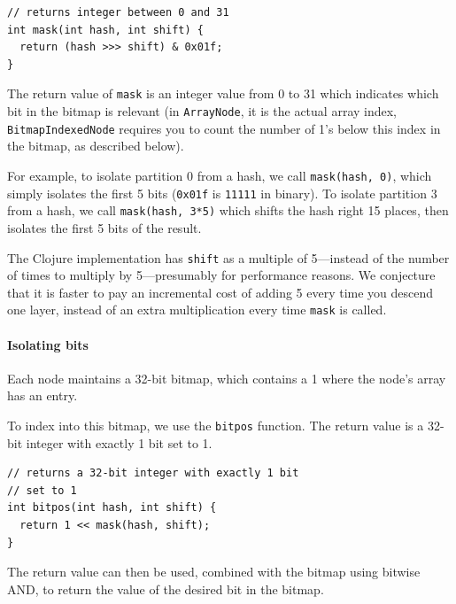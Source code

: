 \documentclass[preprint]{sigplanconf}
\begin{document}
\begin{verbatim}
// returns integer between 0 and 31
int mask(int hash, int shift) {
  return (hash >>> shift) & 0x01f;
}
\end{verbatim}

The return value of \texttt{mask}
is an integer value from 0 to 31
which indicates which bit in the bitmap
is relevant (in \texttt{ArrayNode},
it is the actual array index,
\texttt{BitmapIndexedNode}
requires you to count the number of
1's below this index in the bitmap,
as described below).

For example,
to isolate partition 0 from a hash,
we call
\texttt{mask(hash, 0)},
which simply isolates the first 5 bits
(\texttt{0x01f} is
\texttt{11111} in binary).
To isolate partition 3 from a hash,
we call
\texttt{mask(hash, 3*5)} which shifts
the hash right 15 places, then isolates
the first 5 bits of the result.

The Clojure implementation has
\texttt{shift} as a multiple of 5---instead
of the number of times to multiply by 5---presumably 
for performance reasons.
We conjecture that it is faster
to pay an incremental cost of
adding 5 every time you descend one layer,
instead of an extra multiplication every
time \texttt{mask} is called.

\paragraph{Isolating bits}

Each node maintains a 32-bit bitmap, which
contains a 1 where the node's array has
an entry.

To index into this bitmap, we use
the \texttt{bitpos} function.
The return value is a 32-bit integer
with exactly 1 bit set to 1. 

%

\begin{verbatim}
// returns a 32-bit integer with exactly 1 bit 
// set to 1
int bitpos(int hash, int shift) {
  return 1 << mask(hash, shift);
}
\end{verbatim}


The return value can then 
be used, combined with the bitmap using bitwise AND,
to return the value of the desired bit in the bitmap.
\end{document}

